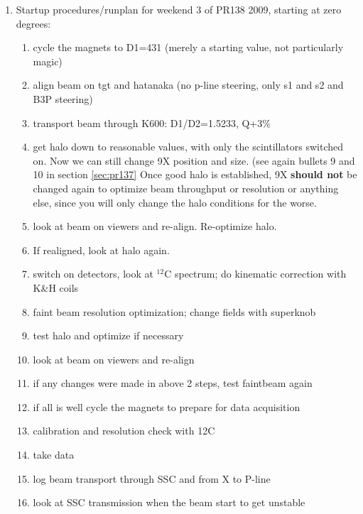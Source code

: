 \documentclass[11pt]{report}
\begin{document}
\begin{enumerate}
\item  Startup procedures/runplan for weekend 3 of PR138 2009, starting at zero degrees:
  \begin{enumerate}   
  \item cycle the magnets to D1=431 (merely a starting value, not particularly magic)
  \item align beam on tgt and hatanaka (no p-line steering, only s1 and s2 and B3P steering)
  \item transport beam through K600: D1/D2=1.5233, Q+3\% 
  \item get halo down to reasonable values, with only the scintillators switched on. 
        Now we can still change 9X position and size. (see again bullets 9 and 10 in section \ref{sec:pr137}
	Once good halo is established, 9X {\bf should not} be changed again to optimize beam throughput
	or resolution or anything else, since you will only change the halo conditions for the worse.
  \item look at beam on viewers and re-align. Re-optimize halo.
  \item If realigned, look at halo again.
  \item switch on detectors, look at $^{12}$C spectrum; do kinematic correction with K\&H coils
  \item faint beam resolution optimization; change fields with superknob
  \item test halo and optimize if necessary
  \item look at beam on viewers and re-align
  \item if any changes were made in above 2 steps, test faintbeam again
  \item if all is well cycle the magnets to prepare for data acquisition
  \item calibration and resolution check with 12C
  \item take data
  \item log beam transport through SSC and from X to P-line 
  \item look at SSC transmission when the beam start to get unstable
  \end{enumerate}   




\end{enumerate}
\end{document}
